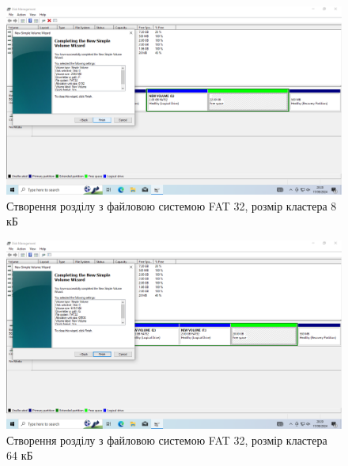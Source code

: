 \documentclass[oneside,14pt]{extarticle}
\begin{document}
\begin{normalsize}
	\begin{figure}[H]
		\centering
		\includegraphics[scale=0.4]{2}
		\caption{Створення розділу з файловою системою FAT 32, розмір кластера 8 кБ}
	\end{figure}
	
	\begin{figure}[H]
		\centering
		\includegraphics[scale=0.4]{3}
		\caption{Створення розділу з файловою системою FAT 32, розмір кластера 64 кБ}
	\end{figure}
	

\end{normalsize}
\end{document}
